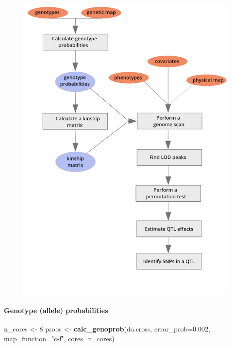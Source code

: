 \documentclass[]{article}
\newenvironment{Shaded}{\begin{snugshade}}{\end{snugshade}}
\newcommand{\KeywordTok}[1]{\textcolor[rgb]{0.13,0.29,0.53}{\textbf{#1}}}
\newcommand{\DataTypeTok}[1]{\textcolor[rgb]{0.13,0.29,0.53}{#1}}
\newcommand{\DecValTok}[1]{\textcolor[rgb]{0.00,0.00,0.81}{#1}}
\newcommand{\FloatTok}[1]{\textcolor[rgb]{0.00,0.00,0.81}{#1}}
\newcommand{\StringTok}[1]{\textcolor[rgb]{0.31,0.60,0.02}{#1}}
\newcommand{\NormalTok}[1]{#1}
\let\oldparagraph\paragraph
\renewcommand{\paragraph}[1]{\oldparagraph{#1}\mbox{}}
\begin{document}
\begin{figure}
\centering
\includegraphics{../figs/mapping-workflow.png}
\caption{}
\end{figure}

\paragraph{\texorpdfstring{\textbf{Genotype (allele)
probabilities}}{Genotype (allele) probabilities}}\label{genotype-allele-probabilities}

\begin{Shaded}
\begin{Highlighting}[]
\NormalTok{n_cores <-}\StringTok{ }\DecValTok{8}
\NormalTok{probs <-}\StringTok{ }\KeywordTok{calc_genoprob}\NormalTok{(do.cross, }\DataTypeTok{error_prob=}\FloatTok{0.002}\NormalTok{, }\DataTypeTok{map_function=}\StringTok{"c-f"}\NormalTok{, }\DataTypeTok{cores=}\NormalTok{n_cores)}
\end{Highlighting}
\end{Shaded}
\end{document}
